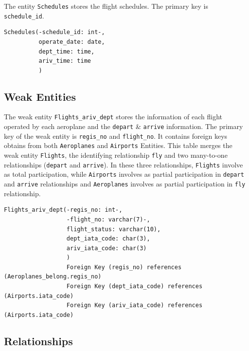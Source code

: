 \documentclass{article}
\begin{document}
	\noindent The entity \texttt{Schedules} stores the flight schedules. The primary key is \texttt{schedule\_id}.
	\begin{lstlisting}[keepspaces=true] 
Schedules(-schedule_id: int-, 
          operate_date: date,
          dept_time: time,
          ariv_time: time
          )
	\end{lstlisting}

	\subsection{Weak Entities}
	
	\noindent The weak entity \texttt{Flights\_ariv\_dept} stores the information of each flight operated by each aeroplane and the \texttt{depart} \& \texttt{arrive} information. The primary key of the weak entity is \texttt{regis\_no} and \texttt{flight\_no}. It contains foreign keys obtains from both \texttt{Aeroplanes} and \texttt{Airports} Entities. This table merges the weak entity \texttt{Flights}, the identifying relationship \texttt{fly} and two many-to-one relationships (\texttt{depart} and \texttt{arrive}). In these three relationships, \texttt{Flights} involve as total participation, while \texttt{Airports} involves as partial participation in \texttt{depart} and \texttt{arrive} relationships and \texttt{Aeroplanes} involves as partial participation in \texttt{fly} relationship.
	\begin{lstlisting}[keepspaces=true]        
Flights_ariv_dept(-regis_no: int-, 
                  -flight_no: varchar(7)-,
                  flight_status: varchar(10),
                  dept_iata_code: char(3),
                  ariv_iata_code: char(3)
                  )
                  Foreign Key (regis_no) references (Aeroplanes_belong.regis_no)
                  Foreign Key (dept_iata_code) references (Airports.iata_code)
                  Foreign Key (ariv_iata_code) references (Airports.iata_code)
	\end{lstlisting}

	\subsection{Relationships}
	
\end{document}
